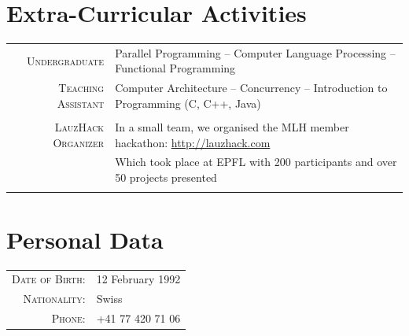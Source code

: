 \documentclass[a4paper,11pt]{article} %
\begin{document}
\section{Extra-Curricular Activities}
\begin{tabular}{rl}
\textsc{\large{Undergraduate}} &
Parallel Programming --
Computer Language Processing -- Functional Programming \\
\textsc{\large{Teaching Assistant}} &
Computer Architecture -- Concurrency -- Introduction to Programming (C, C++, Java) \\
\multicolumn{2}{c}{} \\

\textsc{\large{LauzHack Organizer}} &
In a small team, we organised the MLH member hackathon: \href{http://lauzhack.com}{http://lauzhack.com}\\
& Which took place at EPFL with 200 participants and over 50 projects presented\\
\multicolumn{2}{c}{} \\

\end{tabular}


\section{Personal Data}
\begin{center}
\begin{tabular}{rl}
\textsc{Date of Birth:} & 12 February 1992 \\
\textsc{Nationality:} & Swiss \\
\textsc{Phone:} & +41 77 420 71 06\\
\end{tabular}
\end{center}
\end{document}
